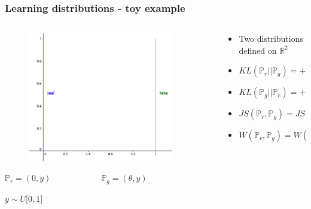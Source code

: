 \documentclass{Bredelebeamer}
\begin{document}
\begin{frame}
	\frametitle{Learning distributions - toy example}
	\begin{columns}
	\begin{column}{0.5\textwidth}
	\begin{figure}[h!]
		\centering
		\includegraphics[width=0.9\textwidth]{two_lines.png}
	\end{figure}
	\pause
	$\mathbb{P}_r = (0, y) \quad \quad \quad \quad \quad \quad \mathbb{P}_g = (\theta, y)$
	\pause
	\begin{center}
		$y \sim U\big[0, 1\big]$
	\end{center}
	\end{column}
	\begin{column}{0.5\textwidth}  %
	\pause
	\begin{itemize}
		\item Two distributions defined on $\mathbb{R}^2$
			\newline
		\pause
		\item  $ KL(\mathbb{P}_r \vert \vert \mathbb{P}_g) = +\infty$
		\pause
		\item  $ KL(\mathbb{P}_g \vert \vert \mathbb{P}_r) = +\infty$
		\pause
		\item  $ JS(\mathbb{P}_r, \mathbb{P}_g) = JS(\mathbb{P}_g, \mathbb{P}_r) = \log 2 $
		\pause
		\item  $ W(\mathbb{P}_r, \mathbb{P}_g) = W(\mathbb{P}_g, \mathbb{P}_r) = \vert \theta \vert $
	\end{itemize}
	\end{column}
	\end{columns}
\end{frame}
\end{document}
